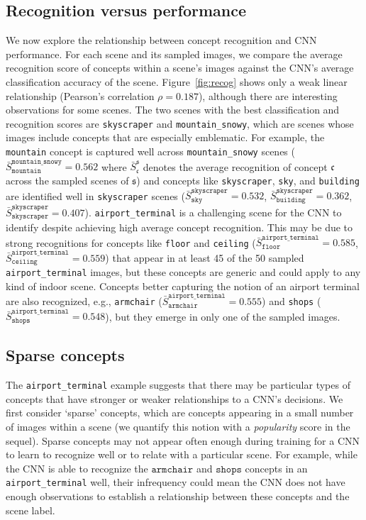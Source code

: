 \documentclass{article}
\begin{document}
\subsection{Recognition versus performance}
\label{subsec:performance_section}
We now explore the relationship between concept recognition and CNN performance. 
For each scene and its sampled images, we compare the average recognition score of concepts within 
a scene's images against the CNN's average classification accuracy of the scene. 
Figure~\ref{fig:recog} shows only a weak linear relationship (Pearson's correlation $\rho = 0.187$), although 
there are interesting observations for some scenes. The two scenes with the best classification
and recognition scores are \texttt{skyscraper} and \texttt{mountain\_snowy}, which are scenes whose
images include concepts that are especially emblematic.
For example, the \texttt{mountain} concept is captured well across 
\texttt{mountain\_snowy} scenes ($\bar{S}^\mathtt{mountain\_snowy}_{\mathtt{mountain}} = 0.562$
where $\bar{S}^\mathfrak{s}_\mathfrak{c}$ denotes the average recognition of concept $\mathfrak{c}$ across
the sampled scenes of $\mathfrak{s}$) 
and concepts like \texttt{skyscraper}, \texttt{sky}, and \texttt{building} are identified well in 
\texttt{skyscraper} scenes ($\bar{S}^{\texttt{skyscraper}}_{\mathtt{sky}} = 0.532$, $\bar{S}^\texttt{skyscraper}_{\mathtt{building}}=0.362$, $\bar{S}^\texttt{skyscraper}_{\mathtt{skyscraper}}=0.407$).
\texttt{airport\_terminal} is a challenging scene for the CNN to identify despite achieving
high average concept recognition. This may be due to strong recognitions for concepts like 
\texttt{floor} and \texttt{ceiling} ($\bar{S}^\texttt{airport\_terminal}_{\mathtt{floor}}=0.585$, 
$\bar{S}^\texttt{airport\_terminal}_{\mathtt{ceiling}}=0.559$) that appear in at least 45 of the 50 sampled \texttt{airport\_terminal} images, but these concepts are generic and could apply to any kind of indoor scene. Concepts better capturing the notion of an airport terminal are also recognized, e.g., \texttt{armchair} ($\bar{S}^\texttt{airport\_terminal}_{\mathtt{armchair}} = 0.555$) and \texttt{shops} ($\bar{S}^\texttt{airport\_terminal}_{\mathtt{shops}} = 0.548$), but they emerge in only one of the sampled images.  


\subsection{Sparse concepts}
The \texttt{airport\_terminal} example suggests that there may be 
particular types of concepts that have stronger or weaker relationships to a CNN's decisions. 
We first consider `sparse' concepts, which are concepts
appearing in a small number of images within a scene 
(we quantify this notion with a \textit{popularity} score in the sequel). 
Sparse concepts may not appear often enough
during training for a CNN to learn to recognize well or to relate with a particular scene. 
For example, while the CNN is able to recognize the $\texttt{armchair}$ and $\texttt{shops}$ 
concepts in an \texttt{airport\_terminal} well, their infrequency 
could mean the CNN does not have enough observations to establish a relationship between
these concepts and the scene label. 
\end{document}

